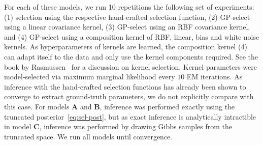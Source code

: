 For each of these models, we run 10 repetitions the following set of experiments: (1) selection using the respective hand-crafted selection function,
(2) GP-select using a linear covariance kernel, (3) GP-select using an RBF covariance kernel, and (4) GP-select using a composition kernel of RBF, linear, bias and white noise kernels.
As hyperparameters of kernels are learned, the composition kernel (4) can adapt itself to the data and only use the kernel components required. 
See the book by Rasmussen~\citep{RasmussenGPbook} for a discussion on kernel selection.
Kernel parameters were model-selected via maximum marginal likelihood every $10$ EM iterations.
As inference with the hand-crafted selection functions has already been shown to converge to extract ground-truth parameters, we do not explicitly compare with this case.
For models \textbf{A} and \textbf{B}, inference was performed exactly using the truncated posterior~\eqref{eq:sel-post}, but as exact inference is analytically intractible in model \textbf{C}, inference was performed by drawing Gibbs samples from the truncated space.
%
We run all models until convergence. %


